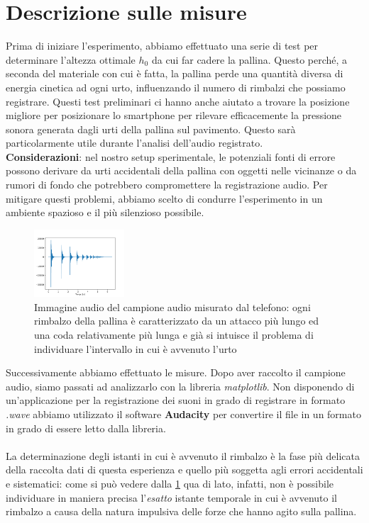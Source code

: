 \documentclass{article}
\begin{document}
\section{Descrizione sulle misure}
Prima di iniziare l'esperimento, abbiamo effettuato una serie di test per determinare l'altezza ottimale $h_0$ da cui far cadere la pallina. Questo perché, a seconda del materiale con cui è fatta, la pallina perde una quantità diversa di energia cinetica ad ogni urto, influenzando il numero di rimbalzi che possiamo registrare. Questi test preliminari ci hanno anche aiutato a trovare la posizione migliore per posizionare lo smartphone per rilevare efficacemente la pressione sonora generata dagli urti della pallina sul pavimento. Questo sarà particolarmente utile durante l'analisi dell'audio registrato. \\
\textbf{Considerazioni}: nel nostro setup sperimentale, le potenziali fonti di errore possono derivare da urti accidentali della pallina con oggetti nelle vicinanze o da rumori di fondo che potrebbero compromettere la registrazione audio. Per mitigare questi problemi, abbiamo scelto di condurre l'esperimento in un ambiente spazioso e il più silenzioso possibile.
\begin{figure}
	\vspace{-1cm}
	\centering
	\includegraphics[width=0.3\textwidth, scale=0.1]{Grafico_rimbalzo.pdf}
	\caption{Immagine audio del campione audio misurato dal telefono: ogni rimbalzo della pallina è caratterizzato da un attacco più lungo ed una coda relativamente più lunga e già si intuisce il problema di individuare l'intervallo in cui è avvenuto l'urto}
	\label{fig:audio}
\end{figure}
\noindent Successivamente abbiamo effettuato le misure. Dopo aver raccolto il campione audio, siamo passati ad analizzarlo con la libreria \emph{matplotlib}. Non disponendo di un'applicazione per la registrazione dei suoni in grado di registrare in formato \emph{.wave} abbiamo utilizzato il software \textbf{Audacity} per convertire il file in un formato in grado di essere letto dalla libreria. \\ \\ \clearpage
\noindent La determinazione degli istanti in cui è avvenuto il rimbalzo è la fase più delicata della raccolta dati di questa esperienza e quello più soggetta agli errori accidentali e sistematici: come si può vedere dalla \ref{fig:audio} qua di lato, infatti, non è possibile individuare in maniera precisa l'\emph{esatto} istante temporale in cui è avvenuto il rimbalzo a causa della natura impulsiva delle forze che hanno agito sulla pallina.
\end{document}
